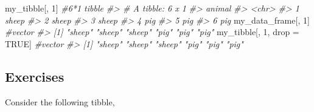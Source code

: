 \documentclass[
]{book}
\newenvironment{Shaded}{\begin{snugshade}}{\end{snugshade}}
\newcommand{\CommentTok}[1]{\textcolor[rgb]{0.56,0.35,0.01}{\textit{#1}}}
\newcommand{\ConstantTok}[1]{\textcolor[rgb]{0.00,0.00,0.00}{#1}}
\newcommand{\DecValTok}[1]{\textcolor[rgb]{0.00,0.00,0.81}{#1}}
\newcommand{\NormalTok}[1]{#1}
\newcommand{\OtherTok}[1]{\textcolor[rgb]{0.56,0.35,0.01}{#1}}
\begin{document}
\begin{Shaded}
\begin{Highlighting}[]
\NormalTok{my\_tibble[, }\DecValTok{1}\NormalTok{]               }\CommentTok{\#6*1 tibble}
\CommentTok{\#\textgreater{} \# A tibble: 6 x 1}
\CommentTok{\#\textgreater{}   animal}
\CommentTok{\#\textgreater{}   \textless{}chr\textgreater{} }
\CommentTok{\#\textgreater{} 1 sheep }
\CommentTok{\#\textgreater{} 2 sheep }
\CommentTok{\#\textgreater{} 3 sheep }
\CommentTok{\#\textgreater{} 4 pig   }
\CommentTok{\#\textgreater{} 5 pig   }
\CommentTok{\#\textgreater{} 6 pig}
\NormalTok{my\_data\_frame[, }\DecValTok{1}\NormalTok{]           }\CommentTok{\#vector}
\CommentTok{\#\textgreater{} [1] "sheep" "sheep" "sheep" "pig"   "pig"   "pig"}
\NormalTok{my\_tibble[, }\DecValTok{1}\NormalTok{, drop }\OtherTok{=} \ConstantTok{TRUE}\NormalTok{]  }\CommentTok{\#vector}
\CommentTok{\#\textgreater{} [1] "sheep" "sheep" "sheep" "pig"   "pig"   "pig"}
\end{Highlighting}
\end{Shaded}

\hypertarget{exercises-23}{%
\subsection{Exercises}\label{exercises-23}}

Consider the following tibble,
\end{document}
